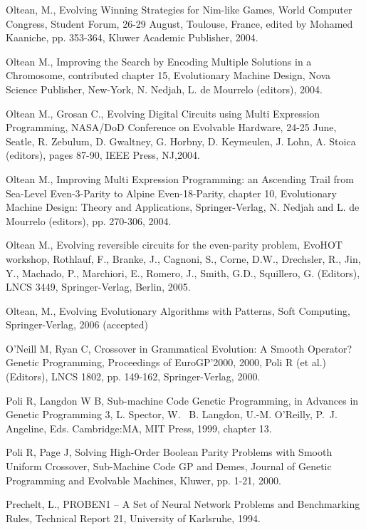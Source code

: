\begin{thebibliography}{500}
Oltean, M., Evolving Winning Strategies for Nim-like Games, World Computer Congress, Student Forum, 26-29 August, Toulouse, France, edited by Mohamed Kaaniche, pp. 353-364, Kluwer Academic Publisher, 2004.

Oltean M.,  Improving the Search by Encoding Multiple Solutions in a Chromosome, contributed chapter 15, Evolutionary Machine Design, Nova Science Publisher, New-York, N. Nedjah, L. de Mourrelo (editors), 2004.

Oltean M., Grosan C., Evolving Digital Circuits using Multi Expression Programming, NASA/DoD Conference on Evolvable Hardware, 24-25 June, Seatle, R. Zebulum, D. Gwaltney, G. Horbny, D. Keymeulen, J. Lohn, A. Stoica (editors), pages 87-90, IEEE Press, NJ,2004.

Oltean M., Improving Multi Expression Programming: an Ascending Trail from Sea-Level Even-3-Parity to Alpine Even-18-Parity, chapter 10, Evolutionary Machine Design: Theory and Applications, Springer-Verlag, N. Nedjah and L. de Mourrelo (editors), pp. 270-306, 2004.

Oltean M.,  Evolving reversible circuits for the even-parity problem, EvoHOT workshop, Rothlauf, F., Branke, J., Cagnoni, S., Corne, D.W., Drechsler, R., Jin, Y., Machado, P., Marchiori, E., Romero, J., Smith, G.D., Squillero, G. (Editors),  LNCS 3449, Springer-Verlag, Berlin, 2005.

Oltean, M., Evolving Evolutionary Algorithms with Patterns, Soft Computing, Springer-Verlag, 2006 (accepted)

O'Neill M, Ryan C, Crossover in Grammatical Evolution: A Smooth Operator? Genetic Programming, Proceedings of EuroGP'2000, 2000, Poli R (et al.) (Editors),  LNCS 1802, pp. 149-162, Springer-Verlag, 2000.

Poli R, Langdon W B, Sub-machine Code Genetic Programming, in Advances in Genetic Programming 3, L. Spector, W. ~B. Langdon, U.-M. O'Reilly, P.~J. Angeline, Eds. Cambridge:MA, MIT Press, 1999, chapter 13.

Poli R, Page J, Solving High-Order Boolean Parity Problems with Smooth 
Uniform Crossover, Sub-Machine Code GP and Demes, Journal of Genetic 
Programming and Evolvable Machines, Kluwer, pp. 1-21, 2000.

Prechelt, L., PROBEN1 -- A Set of Neural Network Problems and Benchmarking 
Rules, Technical Report 21, University of Karlsruhe, 1994.


\end{thebibliography}
